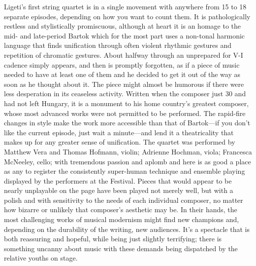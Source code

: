 Ligeti’s first string quartet is in a single movement with anywhere from 15 to 18 separate episodes, depending on how you want to count them. It is pathologically restless and stylistically promiscuous, although at heart it is an homage to the mid- and late-period Bartok which for the most part uses a non-tonal harmonic language that finds unification through often violent rhythmic gestures and repetition of chromatic gestures. About halfway through an unprepared for V-I cadence simply appears, and then is promptly forgotten, as if a piece of music needed to have at least one of them and he decided to get it out of the way as soon as he thought about it. The piece might almost be humorous if there were less desperation in its ceaseless activity. Written when the composer just 30 and had not left Hungary, it is a monument to his home country’s greatest composer, whose most advanced works were not permitted to be performed. The rapid-fire changes in style make the work more accessible than that of Bartok—if you don’t like the current episode, just wait a minute—and lend it a theatricality that makes up for any greater sense of unification. The quartet was performed by Matthew Vera and Thomas Hofmann, violin; Adrienne Hochman, viola; Francesca McNeeley, cello; with tremendous passion and aplomb and here is as good a place as any to register the consistently super-human technique and ensemble playing displayed by the performers at the Festival. Pieces that would appear to be nearly unplayable on the page have been played not merely well, but with a polish and with sensitivity to the needs of each individual composer, no matter how bizarre or unlikely that composer’s aesthetic may be. In their hands, the most challenging works of musical modernism might find new champions and, depending on the durability of the writing, new audiences. It’s a spectacle that is both reassuring and hopeful, while being just slightly terrifying; there is something uncanny about music with these demands being dispatched by the relative youths on stage.

